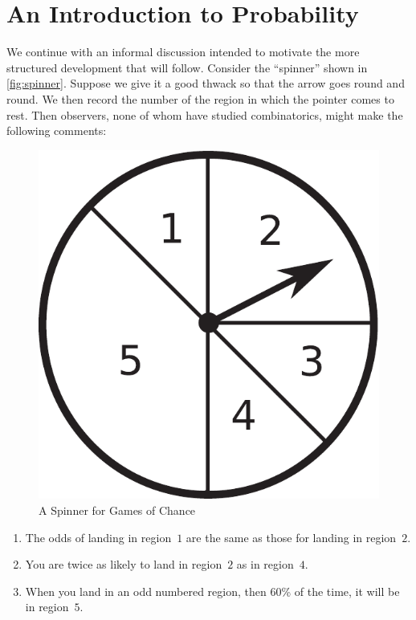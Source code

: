 \section{An Introduction to Probability}

We continue with an informal discussion intended to motivate
the more structured development that will follow.  Consider
the ``spinner'' shown in \autoref{fig:spinner}.  Suppose we give it 
a good thwack so that the arrow goes round and round.  We then 
record the number of the region in which the pointer comes to rest.  
Then observers, none of whom have studied combinatorics, might
make the following comments: 

\begin{figure}
\begin{center}
\includegraphics*[scale=.4]{probability-figs/spinner.pdf}
\caption{A Spinner for Games of Chance}
\label{fig:spinner}
\end{center}
\end{figure}

\begin{enumerate}
\item The odds of landing in region~$1$ are the same as those for
landing in region~$2$.
\item You are twice as likely to land in region~$2$ as in region~$4$.
\item When you land in an odd numbered region, then 60\% of the time,
it will be in region~$5$.
\end{enumerate}

